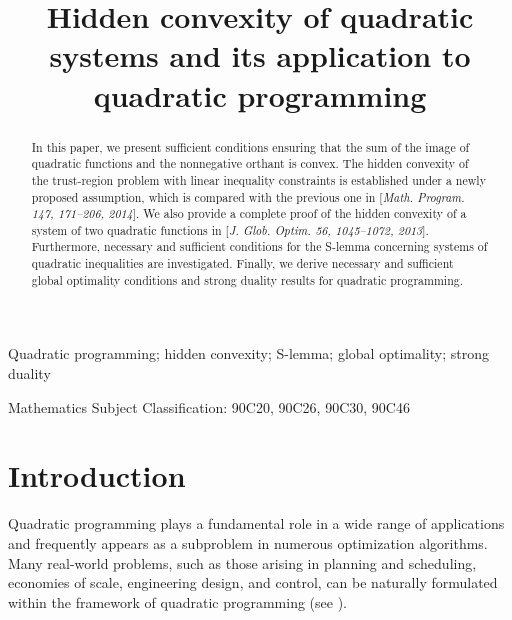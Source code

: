 \documentclass[]{interact}
\theoremstyle{plain}%
\theoremstyle{definition}
\theoremstyle{remark}
\begin{document}
\fontsize{11pt}{15pt}
	\title{Hidden convexity of quadratic systems and its application to quadratic programming}
	
	\author{
	}
	
	\maketitle
	
	\begin{abstract}
		In this paper, we present sufficient conditions ensuring that the sum of the image of quadratic functions and the nonnegative orthant
		is convex.
		The hidden convexity of the trust-region problem with linear inequality constraints
		is established under a newly proposed assumption, which is compared with the previous one in
		[{\it Math. Program. 147, 171--206, 2014}].
		We also provide a complete proof of the hidden convexity of a system of two quadratic functions
		in [{\it J. Glob. Optim. 56, 1045--1072, 2013}].
		Furthermore, necessary and sufficient conditions for the S-lemma concerning systems of quadratic inequalities
		are investigated.
		Finally, we derive necessary and sufficient global optimality conditions and strong duality results
		for quadratic programming.
	\end{abstract}
	
	\begin{keywords}
		Quadratic programming; 
		hidden convexity;  S-lemma;  global optimality; strong duality
	\end{keywords}
	
	{Mathematics Subject Classification: 90C20, 
		90C26, 90C30, 90C46}
	
	\section{Introduction}
	Quadratic programming plays a fundamental role in a wide range of applications
	and frequently appears as a subproblem in numerous optimization algorithms.
	Many real-world problems, such as those arising in planning and scheduling,
	economies of scale, engineering design, and control, can be naturally formulated
	within the framework of quadratic programming
	(see \cite{FloudasVisweswaran1995,LTY05book,Tuy2016}).
	
\end{document}
